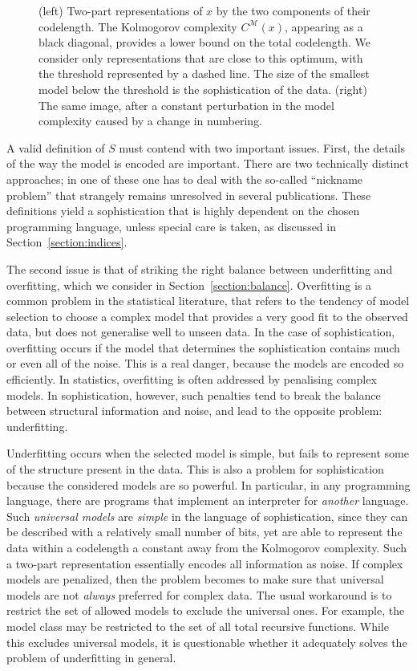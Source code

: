 \documentclass{style/llncs}
\newcommand{\M}{\mathscr M}
\begin{document}
\begin{figure}[tb]
\begin{minipage}{0.55\textwidth}
  \end{minipage}
  \caption{\small (left) Two-part representations of $x$ by the two components of their codelength. The Kolmogorov complexity $C^\M(x)$, appearing as a black diagonal, provides a lower bound on the total codelength. We consider only representations that are close to this optimum, with the threshold represented by a dashed line. The size of the smallest model below the threshold is the sophistication of the data. (right) The same image, after a constant perturbation in the model complexity caused by a change in numbering.}
  \label{fig:diagram}
\end{figure}

A valid definition of $S$ must contend with two important issues. First, the details of the way the model is encoded are important. There are two technically distinct approaches; in one of these one has to deal with the so-called ``nickname problem'' that strangely remains unresolved in several publications. These definitions yield a sophistication that is highly dependent on the chosen programming language, unless special care is taken, as discussed in Section~\ref{section:indices}.

The second issue is that of striking the right balance between underfitting and overfitting, which we consider in Section~\ref{section:balance}. Overfitting is a common problem in the statistical literature, that refers to the tendency of model selection to choose a complex model that provides a very good fit to the observed data, but does not generalise well to unseen data. In the case of sophistication, overfitting occurs if the model that determines the sophistication contains much or even all of the noise. This is a real danger, because the models are encoded so efficiently. In statistics, overfitting is often addressed by penalising complex models. In sophistication, however, such penalties tend to break the balance between structural information and noise, and lead to the opposite problem: underfitting.

Underfitting occurs when the selected model is simple, but fails to represent some of the structure present in the data. This is also a problem for sophistication because the considered models are so powerful. In particular, in any programming language, there are programs that implement an interpreter for \emph{another} language. Such \emph{universal models} are \emph{simple} in the language of sophistication, since they can be described with a relatively small number of bits, yet are able to represent the data within a codelength a constant away from the Kolmogorov complexity. Such a two-part representation essentially encodes all information as noise. If complex models are penalized, then the problem becomes to make sure that universal models are not \emph{always} preferred for complex data. The usual workaround is to restrict the set of allowed models to exclude the universal ones. For example, the model class may be restricted to the set of all total recursive functions. While this excludes universal models, it is questionable whether it adequately solves the problem of underfitting in general.
\end{document}
